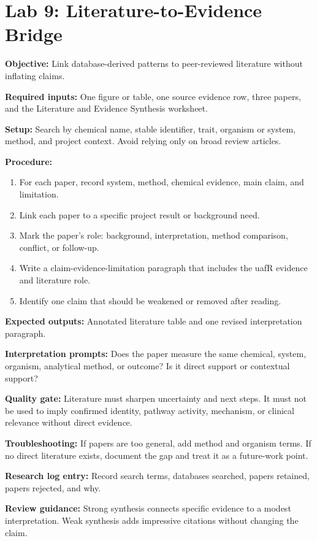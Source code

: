 \section{Lab 9: Literature-to-Evidence Bridge}
\textbf{Objective:} Link database-derived patterns to peer-reviewed literature without inflating claims.

\textbf{Required inputs:} One figure or table, one source evidence row, three papers, and the Literature and Evidence Synthesis worksheet.

\textbf{Setup:} Search by chemical name, stable identifier, trait, organism or system, method, and project context. Avoid relying only on broad review articles.

\textbf{Procedure:}
\begin{enumerate}
  \item For each paper, record system, method, chemical evidence, main claim, and limitation.
  \item Link each paper to a specific project result or background need.
  \item Mark the paper's role: background, interpretation, method comparison, conflict, or follow-up.
  \item Write a claim-evidence-limitation paragraph that includes the uafR evidence and literature role.
  \item Identify one claim that should be weakened or removed after reading.
\end{enumerate}

\textbf{Expected outputs:} Annotated literature table and one revised interpretation paragraph.

\textbf{Interpretation prompts:} Does the paper measure the same chemical, system, organism, analytical method, or outcome? Is it direct support or contextual support?

\textbf{Quality gate:} Literature must sharpen uncertainty and next steps. It must not be used to imply confirmed identity, pathway activity, mechanism, or clinical relevance without direct evidence.

\textbf{Troubleshooting:} If papers are too general, add method and organism terms. If no direct literature exists, document the gap and treat it as a future-work point.

\textbf{Research log entry:} Record search terms, databases searched, papers retained, papers rejected, and why.

\textbf{Review guidance:} Strong synthesis connects specific evidence to a modest interpretation. Weak synthesis adds impressive citations without changing the claim.

